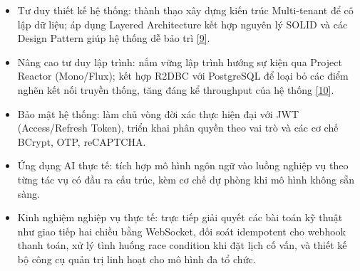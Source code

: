 \documentclass[12pt,a4paper]{article}
\begin{document}
\begin{itemize}
    \item Tư duy thiết kế hệ thống: thành thạo xây dựng kiến trúc Multi-tenant để cô lập dữ liệu; áp dụng Layered Architecture kết hợp nguyên lý SOLID và các Design Pattern giúp hệ thống dễ bảo trì \hyperref[ref:poeaa]{[9]}.
    \item Nâng cao tư duy lập trình: nắm vững lập trình hướng sự kiện qua Project Reactor (Mono/Flux); kết hợp R2DBC với PostgreSQL để loại bỏ các điểm nghẽn kết nối truyền thống, tăng đáng kể throughput của hệ thống \hyperref[ref:reactive]{[10]}.
    \item Bảo mật hệ thống: làm chủ vòng đời xác thực hiện đại với JWT (Access/Refresh Token), triển khai phân quyền theo vai trò và các cơ chế BCrypt, OTP, reCAPTCHA.
    \item Ứng dụng AI thực tế: tích hợp mô hình ngôn ngữ vào luồng nghiệp vụ theo từng tác vụ có đầu ra cấu trúc, kèm cơ chế dự phòng khi mô hình không sẵn sàng.
    \item Kinh nghiệm nghiệp vụ thực tế: trực tiếp giải quyết các bài toán kỹ thuật như giao tiếp hai chiều bằng WebSocket, đối soát idempotent cho webhook thanh toán, xử lý tình huống race condition khi đặt lịch cố vấn, và thiết kế bộ công cụ quản trị linh hoạt cho mô hình đa tổ chức.
\end{itemize}
\vspace{-8pt}

\end{document}

